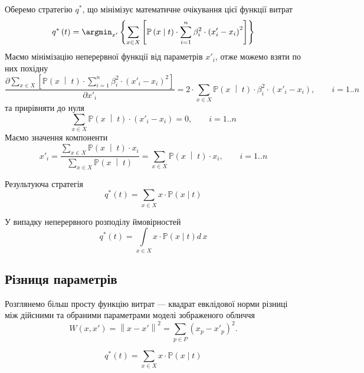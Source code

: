 Оберемо стратегію $q^*$,
що мінімізує математичне очікування цієї функції витрат
\begin{equation*}
  q^* \left( t \right)
  = \argmin_{x'} \left\{
    \sum\limits_{x \in X} \left[
        \mathbb{P} \left( x \;\middle|\;  t \right)
        \cdot \sum_{i = 1}^n \beta_i^2 \cdot \left( x'_i - x_i \right)^2
      \right]
    \right\}
\end{equation*}
Маємо мінімізацію неперервної функції від параметрів $x'_i$,
отже можемо взяти по них похідну
\begin{equation*}
  \frac{\partial \sum\limits_{x \in X} \left[
      \mathbb{P} \left( x \;\middle|\;  t \right)
      \cdot \sum\limits_{i = 1}^n \beta_i^2 \cdot \left( x'_i - x_i \right)^2
  \right]}{\partial x'_i}
  = 2 \cdot \sum_{x \in X} \mathbb{P} \left( x \;\middle|\;  t \right)
    \cdot \beta_i^2 \cdot \left( x'_i - x_i \right), \qquad i = 1..n
\end{equation*}
та прирівняти до нуля
\begin{equation*}
  \sum_{x \in X} \mathbb{P} \left( x \;\middle|\;  t \right)
  \cdot \left( x'_i - x_i \right) = 0, \qquad i = 1..n
\end{equation*}
Маємо значення компоненти
\begin{equation*}
  x'_i = \frac{\sum\limits_{x \in X}
    \mathbb{P} \left( x \;\middle|\;  t \right) \cdot x_i}
    {\sum\limits_{x \in X}
      \mathbb{P} \left( x \;\middle|\;  t \right)}
  = \sum\limits_{x \in X}
    \mathbb{P} \left( x \;\middle|\;  t \right) \cdot x_i, \qquad i = 1..n
\end{equation*}

Результуюча стратегія
\begin{equation*}
  q^*\left( t \right)
  = \sum_{x \in X} x \cdot \mathbb{P}\left( x \mid t \right)
\end{equation*}

У випадку неперервного розподілу ймовірностей
\begin{equation*}
  q^*\left( t \right)
  = \int\limits_{x \in X} x \cdot \mathbb{P}\left( x \mid t \right) d\,x
\end{equation*}

\subsection{Різниця параметрів}

Розглянемо більш просту функцію витрат ---
квадрат евклідової норми різниці між дійсними та обраними параметрами
моделі зображеного обличчя
\begin{equation*}
  W \left( x, x' \right)
  = \left\| x - x' \right\|^2
  = \sum_{p \in P} \left( x_p - x'_p \right)^2.
\end{equation*}

\begin{equation*}
  q^* \left( t \right)
  = \sum_{x \in X} x \cdot \mathbb{P}\left( x \mid t \right)
\end{equation*}
